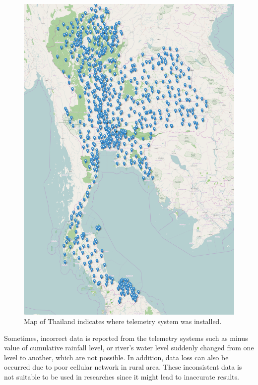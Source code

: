 \documentclass[conference]{IEEEtran}
\begin{document}
\begin{figure}
	\includegraphics[width=\linewidth]{map.png}
	\caption{Map of Thailand indicates where telemetry system was installed.}
	\label{fig:tele_station_map}
\end{figure}

Sometimes, incorrect data is reported from the telemetry systems such as minus value of cumulative rainfall level, or river’s water level suddenly changed from one level to another, which are not possible. In addition, data loss can also be occurred due to poor cellular network in rural area. These inconsistent data is not suitable to be used in researches since it might lead to inaccurate results.
\end{document}
